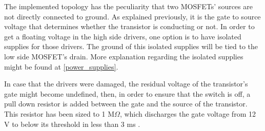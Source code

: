 The implemented topology has the peculiarity that two MOSFETs' sources are not directly connected to ground. As explained previously, it is the gate to source voltage that determines whether the transistor is conducting or not. In order to get a floating voltage in the high side drivers, one option is to have isolated supplies for those drivers. The ground of this isolated supplies will be tied to the low side MOSFET's drain. More explanation regarding the isolated supplies might be found at \ref{power_supplies}.

In case that the drivers were damaged, the residual voltage of the transistor's gate might become undefined, then, in order to ensure that the switch is off, a pull down resistor is added between the gate and the source of the transistor. This resistor has been sized to 1 M$\Omega$, which discharges the gate voltage from 12 V to below its threshold in less than 3 ms .
